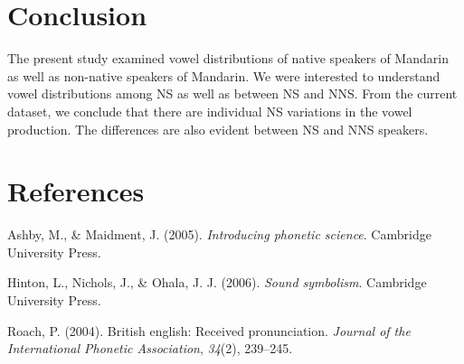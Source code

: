\documentclass[man, fleqn, noextraspace]{apa6}
\begin{document}
\section{Conclusion}\label{conclusion}

The present study examined vowel distributions of native speakers of
Mandarin as well as non-native speakers of Mandarin. We were interested
to understand vowel distributions among NS as well as between NS and
NNS. From the current dataset, we conclude that there are individual NS
variations in the vowel production. The differences are also evident
between NS and NNS speakers.

\newpage

\section{References}\label{references}

\begingroup
\setlength{\parindent}{-0.5in} \setlength{\leftskip}{0.5in}

\hypertarget{refs}{}
\hypertarget{ref-ashby2005}{}
Ashby, M., \& Maidment, J. (2005). \emph{Introducing phonetic science}.
Cambridge University Press.

\hypertarget{ref-hinton2006}{}
Hinton, L., Nichols, J., \& Ohala, J. J. (2006). \emph{Sound symbolism}.
Cambridge University Press.

\hypertarget{ref-roach2004}{}
Roach, P. (2004). British english: Received pronunciation. \emph{Journal
of the International Phonetic Association}, \emph{34}(2), 239--245.

\endgroup
\end{document}
